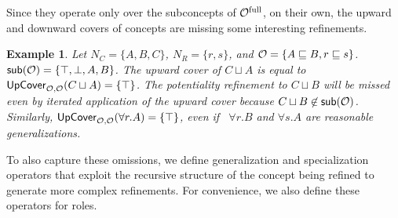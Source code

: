 \documentclass[
]{ceurart}
\newtheorem{example}{Example}
\begin{document}
Since they operate only over the subconcepts of ${\mathcal{O}^\textnormal{full}}$, on their own, the upward and downward covers of concepts are missing some interesting refinements.
\begin{example} \label{exa:up-cover}
  Let $N_C = \{A, B, C\}$, $N_R = \{ r, s \}$, and $\mathcal{O} = \{A \sqsubseteq B, r \sqsubseteq s\}$. $\mathop{\mathsf{sub}}(\mathcal{O}) = \{\top, \bot, A, B\}$. The upward cover of $C \sqcup A$ is equal to ${\mathsf{UpCover}}_{\mathcal{O},\mathcal{O}}(C \sqcup A) = \{ \top \}$. The potentiality refinement to $C \sqcup B$ will be missed even by iterated application of the upward cover because $C \sqcup B \not\in \mathop{\mathsf{sub}}(\mathcal{O})$. Similarly, ${\mathsf{UpCover}}_{\mathcal{O},\mathcal{O}}(\forall r.A) = \{ \top \}$, even if \  $\forall r.B$ and $\forall s.A$ are reasonable generalizations.
\end{example}

To also capture these omissions, we define generalization and specialization operators that exploit the recursive structure of the concept being refined to generate more complex refinements. For convenience, we also define these operators for roles.
\end{document}
